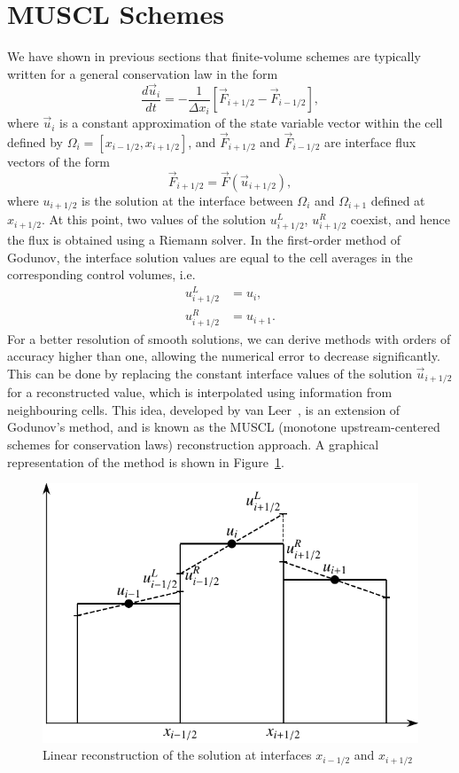 \section{MUSCL Schemes}\label{sec:muscl}
We have shown in previous sections that finite-volume schemes are typically written for a general conservation law in the form
\begin{equation}
	\frac{d  \vec u_i}{dt} = - \frac{1}{\Delta x_i} \left[  \vec F_{i+1/2} -   \vec F_{i-1/2}\right],
\end{equation}
where $\vec u_i$ is a constant approximation of the state variable vector within the cell defined by $\Omega_i = [x_{i-1/2}, x_{i+1/2}]$, and $\vec F_{i+1/2}$ and $\vec F_{i-1/2}$ are interface flux vectors of the form
\begin{equation}
	\vec F_{i+1/2} = \vec F(\vec u_{i+1/2}),
\end{equation}
where $u_{i+1/2}$ is the solution at the interface between $\Omega_i$ and $\Omega_{i+1}$ defined at $x_{i+1/2}$. At this point, two values of the solution $u_{i+1/2}^L$, $u_{i+1/2}^R$ coexist, and hence the flux is obtained using a Riemann solver. In the first-order method of Godunov, the interface solution values are equal to the cell averages in the corresponding control volumes, i.e. 
\begin{align}
	u_{i+1/2}^L &= u_i,\\
	u_{i+1/2}^R &= u_{i+1}.
\end{align}
For a better resolution of smooth solutions, we can derive methods with orders of accuracy higher than one, allowing the numerical error to decrease significantly. This can be done by replacing the constant interface values of the solution $\vec u_{i+1/2}$ for a reconstructed value, which is interpolated using information from neighbouring cells. This idea, developed by van Leer~\cite{van1974towards}, is an extension of Godunov's method, and is known as the MUSCL (monotone upstream-centered schemes for conservation laws) reconstruction approach. A graphical representation of the method is shown in Figure~\ref{fig:muscl_scheme}.
\begin{figure}[htbp]
	\centering
	\includegraphics[width=0.5\linewidth]{Pictures/muscl_scheme}
	\caption{Linear reconstruction of the solution at interfaces $x_{i-1/2}$ and $x_{i+1/2}$}
	\label{fig:muscl_scheme}
\end{figure}
